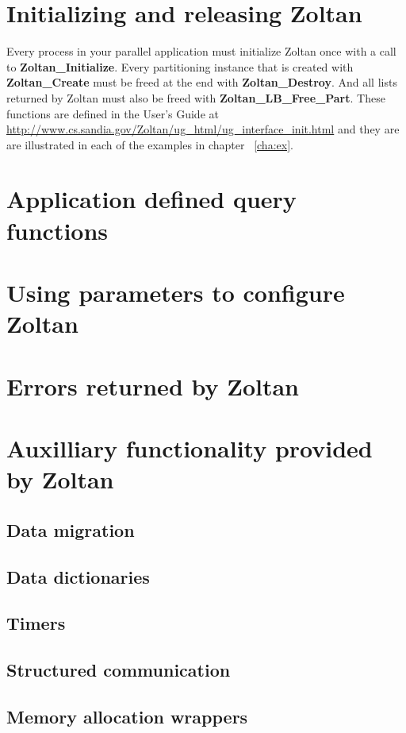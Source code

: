 \section{Initializing and releasing Zoltan}

Every process in your parallel application must initialize Zoltan once
with a call to \textbf{Zoltan\_Initialize}.  Every
partitioning instance that is created with \textbf{Zoltan\_Create} must be freed at
the end with \textbf{Zoltan\_Destroy}.  And all lists returned by
Zoltan must also be freed with \textbf{Zoltan\_LB\_Free\_Part}.  These functions
are defined in the User's Guide at
\url{http://www.cs.sandia.gov/Zoltan/ug\_html/ug\_interface\_init.html}
and they are are illustrated in each of the examples in chapter ~\ref{cha:ex}.

\section{Application defined query functions}

\section{Using parameters to configure Zoltan}

\section{Errors returned by Zoltan}

\section{Auxilliary functionality provided by Zoltan}

\subsection{Data migration}
\subsection{Data dictionaries}
\subsection{Timers}
\subsection{Structured communication}
\subsection{Memory allocation wrappers}
